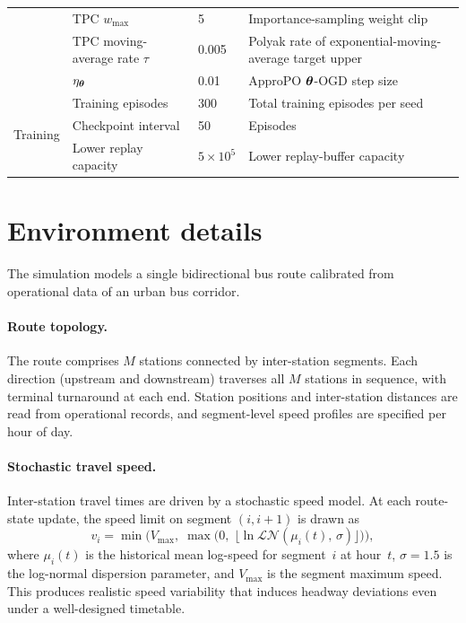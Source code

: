 \begin{table}[H]
\begin{tabular}{@{}p{}p{}p{}p{}@{}}
  & TPC $w_{\max}$            & 5             & Importance-sampling weight clip \\
  & TPC moving-average rate $\tau$ & 0.005     & Polyak rate of exponential-moving-average target upper \\
  & $\eta_{\boldsymbol{\theta}}$        & 0.01          & ApproPO $\boldsymbol{\theta}$-OGD step size \\
\midrule
\multirow{3}{*}{Training}
  & Training episodes       & 300     & Total training episodes per seed \\
  & Checkpoint interval            & 50      & Episodes \\
  & Lower replay capacity  & $5 \times 10^{5}$ & Lower replay-buffer capacity \\
\bottomrule
\end{tabular}
\end{table}

\section{Environment details}
\label{app:env}

The simulation models a single bidirectional bus route calibrated from operational data of an urban bus corridor.

\paragraph{Route topology.}
The route comprises $M$ stations connected by inter-station segments.
Each direction (upstream and downstream) traverses all $M$ stations in sequence, with terminal turnaround at each end.
Station positions and inter-station distances are read from operational records, and segment-level speed profiles are specified per hour of day.

\paragraph{Stochastic travel speed.}
Inter-station travel times are driven by a stochastic speed model.
At each route-state update, the speed limit on segment $(i, i{+}1)$ is drawn as
\begin{equation}
  v_{i} = \min\!\bigl(V_{\max},\;\max\bigl(0,\;\lfloor\ln\mathcal{LN}(\mu_i(t),\,\sigma)\rfloor\bigr)\bigr),
\end{equation}
where $\mu_i(t)$ is the historical mean log-speed for segment~$i$ at hour~$t$, $\sigma = 1.5$ is the log-normal dispersion parameter, and $V_{\max}$ is the segment maximum speed.
This produces realistic speed variability that induces headway deviations even under a well-designed timetable.

